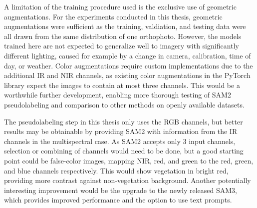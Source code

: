 \documentclass[english, 12pt, a4paper, sci, utf8, a-2b, online]{aaltothesis}
\begin{document}
A limitation of the training procedure used is the exclusive use of geometric augmentations. For the experiments conducted in this thesis, geometric augmentations were sufficient as the training, valdiation, and testing data were all drawn from the same distribution of one orthophoto. However, the models trained here are not expected to generalize well to imagery with significantly different lighting, caused for example by a change in camera, calibration, time of day, or weather. Color augmentations require custom implementations due to the additional IR and NIR channels, as existing color augmentations in the PyTorch library expect the images to contain at most three channels. This would be a worthwhile further development, enabling more thorough testing of SAM2 pseudolabeling and comparison to other methods on openly available datasets.

The pseudolabeling step in this thesis only uses the RGB channels, but better results may be obtainable by providing SAM2 with information from the IR channels in the multispectral case. As SAM2 accepts only 3 input channels, selection or combining of channels would need to be done, but a good starting point could be false-color images, mapping NIR, red, and green to the red, green, and blue channels respectively. This would show vegetation in bright red, providing more contrast against non-vegetation background. Another potentially interesting improvement would be the upgrade to the newly released SAM3, which provides improved performance and the option to use text prompts.


\clearpage

\thesisbibliography


\end{document}
